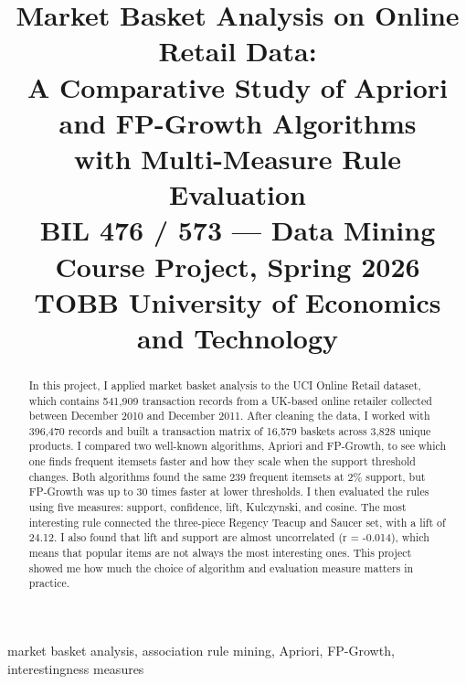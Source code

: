 \documentclass[conference]{IEEEtran}
\begin{document}
\title{Market Basket Analysis on Online Retail Data:\\
A Comparative Study of Apriori and FP-Growth Algorithms\\
with Multi-Measure Rule Evaluation\\
{\footnotesize BIL 476 / 573 --- Data Mining Course Project, Spring 2026\\
    TOBB University of Economics and Technology}
}

\author{
}

\maketitle

\begin{abstract}
In this project, I applied market basket analysis to the UCI Online Retail dataset, which contains 541,909 transaction records from a UK-based online retailer collected between December 2010 and December 2011. After cleaning the data, I worked with 396,470 records and built a transaction matrix of 16,579 baskets across 3,828 unique products. I compared two well-known algorithms, Apriori and FP-Growth, to see which one finds frequent itemsets faster and how they scale when the support threshold changes. Both algorithms found the same 239 frequent itemsets at 2\% support, but FP-Growth was up to 30 times faster at lower thresholds. I then evaluated the rules using five measures: support, confidence, lift, Kulczynski, and cosine. The most interesting rule connected the three-piece Regency Teacup and Saucer set, with a lift of 24.12. I also found that lift and support are almost uncorrelated (r = -0.014), which means that popular items are not always the most interesting ones. This project showed me how much the choice of algorithm and evaluation measure matters in practice.
\end{abstract}

\begin{IEEEkeywords}
market basket analysis, association rule mining, Apriori, FP-Growth, interestingness measures
\end{IEEEkeywords}

\end{document}
